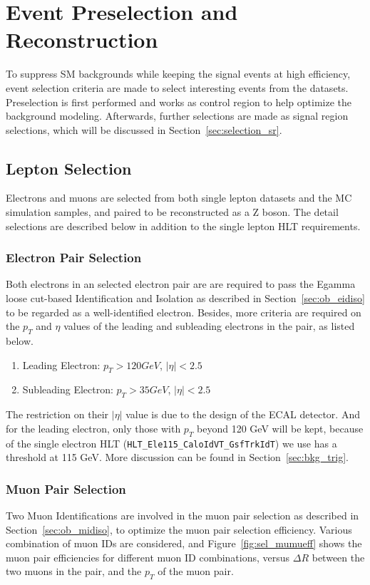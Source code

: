 \section{Event Preselection and Reconstruction}
To suppress SM backgrounds while keeping the signal events at high efficiency, event selection criteria are made to select interesting events from the datasets. Preselection is first performed and works as control region to help optimize the background modeling. Afterwards, further selections are made as signal region selections, which will be discussed in Section~\ref{sec:selection_sr}.

\subsection{Lepton Selection}
Electrons and muons are selected from both single lepton datasets and the MC simulation samples, and paired to be reconstructed as a Z boson. The detail selections are described below in addition to the single lepton HLT requirements.
\subsubsection{Electron Pair Selection}
Both electrons in an selected electron pair are are required to pass the Egamma loose cut-based Identification and Isolation as described in Section~\ref{sec:ob_eidiso} to be regarded as a well-identified electron. Besides, more criteria are required on the $p_T$ and $\eta$ values of the leading and subleading electrons in the pair, as listed below.
\begin{enumerate}
\item Leading Electron: $p_T >120 GeV$, $|\eta|<2.5$
\item Subleading Electron: $p_T >35 GeV$, $|\eta|<2.5$
\end{enumerate}

The restriction on their $|\eta|$ value is due to the design of the ECAL detector. And for the leading electron, only those with $p_T$ beyond 120 GeV will be kept, because of the single electron HLT (\texttt{HLT\_Ele115\_CaloIdVT\_GsfTrkIdT}) we use has a threshold at 115 GeV. More discussion can be found in Section~\ref{sec:bkg_trig}.

\subsubsection{Muon Pair Selection}\label{sec:muonselection}
Two Muon Identifications are involved in the muon pair selection as described in Section~\ref{sec:ob_midiso}, to optimize the muon pair selection efficiency. Various combination of muon IDs are considered, and Figure~\ref{fig:sel_mumueff} shows the muon pair efficiencies for different muon ID combinations, versus $\Delta R$ between the two muons in the pair, and the $p_T$ of the muon pair.

